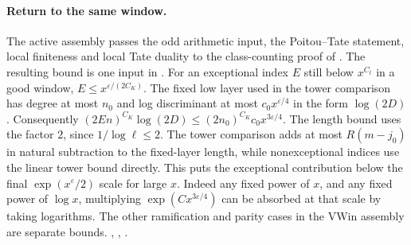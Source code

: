 \paragraph{Return to the same window.}
The active assembly passes the odd arithmetic input, the Poitou--Tate statement, local finiteness and local Tate duality to the class-counting proof of . The resulting bound is one input in . For an exceptional index \(E\) still below \(x^{C_t}\) in a good window, \(E\le x^{\varepsilon/(2C_K)}\). The fixed low layer used in the tower comparison has degree at most \(n_0\) and log discriminant at most \(c_0 x^{\varepsilon/4}\) in the form \(\log(2D)\). Consequently \((2En)^{C_K}\log(2D)\le (2n_0)^{C_K}c_0 x^{3\varepsilon/4}\). The length bound uses the factor \(2\), since \(1/\log\ell\le2\). The tower comparison adds at most \(R(m-j_0)\) in natural subtraction to the fixed-layer length, while nonexceptional indices use the linear tower bound directly. This puts the exceptional contribution below the final \(\exp(x^\varepsilon/2)\) scale for large \(x\). Indeed any fixed power of \(x\), and any fixed power of \(\log x\), multiplying \(\exp(C x^{3\varepsilon/4})\) can be absorbed at that scale by taking logarithms. The other ramification and parity cases in the \(\mathrm{VWin}\) assembly are separate bounds. 
,
,
.

